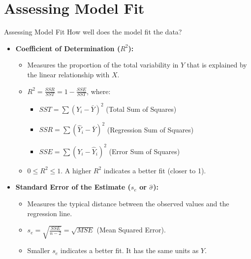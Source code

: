 \documentclass[aspectratio=169]{beamer}
\begin{document}
\section{Assessing Model Fit}
\begin{frame}{Assessing Model Fit}
  How well does the model fit the data?
  \begin{itemize}
    \item \textbf{Coefficient of Determination ($R^2$):}
    \begin{itemize}
        \item Measures the proportion of the total variability in $Y$ that is explained by the linear relationship with $X$.
        \item $R^2 = \frac{SSR}{SST} = 1 - \frac{SSE}{SST}$, where:
            \begin{itemize}
                \item $SST = \sum (Y_i - \bar{Y})^2$ (Total Sum of Squares)
                \item $SSR = \sum (\hat{Y}_i - \bar{Y})^2$ (Regression Sum of Squares)
                \item $SSE = \sum (Y_i - \hat{Y}_i)^2$ (Error Sum of Squares)
            \end{itemize}
        \item $0 \le R^2 \le 1$. A higher $R^2$ indicates a better fit (closer to 1).
    \end{itemize}
    \vspace{1em}
    \item \textbf{Standard Error of the Estimate ($s_e$ or $\hat{\sigma}$):}
    \begin{itemize}
        \item Measures the typical distance between the observed values and the regression line.
        \item $s_e = \sqrt{\frac{SSE}{n-2}} = \sqrt{MSE}$ (Mean Squared Error).
        \item Smaller $s_e$ indicates a better fit. It has the same units as $Y$.
    \end{itemize}
  \end{itemize}
\end{frame}
\end{document}

